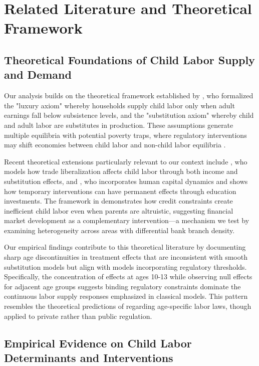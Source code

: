 \documentclass[12pt]{article}
\begin{document}
\section{Related Literature and Theoretical Framework}

\subsection{Theoretical Foundations of Child Labor Supply and Demand}

Our analysis builds on the theoretical framework established by \cite{basu1998economics}, who formalized the "luxury axiom" whereby households supply child labor only when adult earnings fall below subsistence levels, and the "substitution axiom" whereby child and adult labor are substitutes in production. These assumptions generate multiple equilibria with potential poverty traps, where regulatory interventions may shift economies between child labor and non-child labor equilibria \cite{basu2000intergenerational, doepke2005dynamics}.

Recent theoretical extensions particularly relevant to our context include \citet{edmonds2007selection}, who models how trade liberalization affects child labor through both income and substitution effects, and \citet{dumas2020child}, who incorporates human capital dynamics and shows how temporary interventions can have permanent effects through education investments. The framework in \citet{baland2000child} demonstrates how credit constraints create inefficient child labor even when parents are altruistic, suggesting financial market development as a complementary intervention—a mechanism we test by examining heterogeneity across areas with differential bank branch density.

Our empirical findings contribute to this theoretical literature by documenting sharp age discontinuities in treatment effects that are inconsistent with smooth substitution models but align with models incorporating regulatory thresholds. Specifically, the concentration of effects at ages 10-13 while observing null effects for adjacent age groups suggests binding regulatory constraints dominate the continuous labor supply responses emphasized in classical models. This pattern resembles the theoretical predictions of \citet{moehling1999state} regarding age-specific labor laws, though applied to private rather than public regulation.

\subsection{Empirical Evidence on Child Labor Determinants and Interventions}
\end{document}
